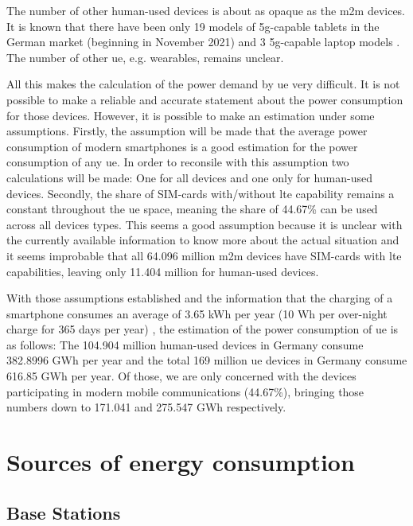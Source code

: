 \documentclass[11pt,a4paper]{article}
\begin{document}
The number of other human-used devices is about as opaque as the \acrshort{m2m} devices.
It is known that there have been only 19 models of \acrshort{5g}-capable tablets in the German market (beginning in November 2021) \citep{tabletmodels} and 3 \acrshort{5g}-capable laptop models \citep{laptopmodels}.
The number of other \acrlong{ue}, e.g. wearables, remains unclear.

All this makes the calculation of the power demand by \acrlong{ue} very difficult.
It is not possible to make a reliable and accurate statement about the power consumption for those devices.
However, it is possible to make an estimation under some assumptions.
Firstly, the assumption will be made that the average power consumption of modern smartphones is a good estimation for the power consumption of any \acrshort{ue}.
In order to reconsile with this assumption two calculations will be made: One for all devices and one only for human-used devices.
Secondly, the share of SIM-cards with/without \acrshort{lte} capability remains a constant throughout the \acrlong{ue} space, meaning the share of 44.67\% can be used across all devices types.
This seems a good assumption because it is unclear with the currently available information to know more about the actual situation and it seems improbable that all 64.096 million \acrshort{m2m} devices have SIM-cards with \acrshort{lte} capabilities, leaving only 11.404 million for human-used devices.


With those assumptions established and the information that the charging of a smartphone consumes an average of 3.65 kWh per year (10 Wh per over-night charge for 365 days per year) \citep{smartphonecharge}, the estimation of the power consumption of \acrshort{ue} is as follows:
The 104.904 million human-used devices in Germany consume 382.8996 GWh per year and the total 169 million \acrshort{ue} devices in Germany consume 616.85 GWh per year.
Of those, we are only concerned with the devices participating in modern mobile communications (44.67\%), bringing those numbers down to 171.041 and 275.547 GWh respectively.

\section{Sources of energy consumption}\label{sec:energyconsumption}
\subsection{Base Stations}\label{subsec:BSConsumption}
\end{document}
